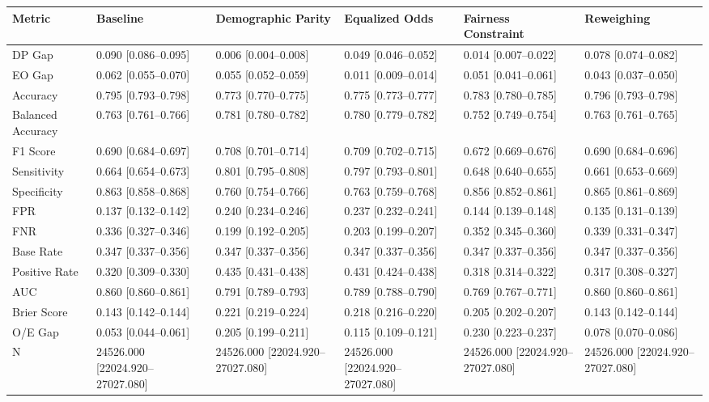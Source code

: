 \begin{tabular}{llllll}
\toprule
Metric & Baseline & Demographic Parity & Equalized Odds & Fairness Constraint & Reweighing \\
\midrule
DP Gap & 0.090 [0.086--0.095] & 0.006 [0.004--0.008] & 0.049 [0.046--0.052] & 0.014 [0.007--0.022] & 0.078 [0.074--0.082] \\
EO Gap & 0.062 [0.055--0.070] & 0.055 [0.052--0.059] & 0.011 [0.009--0.014] & 0.051 [0.041--0.061] & 0.043 [0.037--0.050] \\
Accuracy & 0.795 [0.793--0.798] & 0.773 [0.770--0.775] & 0.775 [0.773--0.777] & 0.783 [0.780--0.785] & 0.796 [0.793--0.798] \\
Balanced Accuracy & 0.763 [0.761--0.766] & 0.781 [0.780--0.782] & 0.780 [0.779--0.782] & 0.752 [0.749--0.754] & 0.763 [0.761--0.765] \\
F1 Score & 0.690 [0.684--0.697] & 0.708 [0.701--0.714] & 0.709 [0.702--0.715] & 0.672 [0.669--0.676] & 0.690 [0.684--0.696] \\
Sensitivity & 0.664 [0.654--0.673] & 0.801 [0.795--0.808] & 0.797 [0.793--0.801] & 0.648 [0.640--0.655] & 0.661 [0.653--0.669] \\
Specificity & 0.863 [0.858--0.868] & 0.760 [0.754--0.766] & 0.763 [0.759--0.768] & 0.856 [0.852--0.861] & 0.865 [0.861--0.869] \\
FPR & 0.137 [0.132--0.142] & 0.240 [0.234--0.246] & 0.237 [0.232--0.241] & 0.144 [0.139--0.148] & 0.135 [0.131--0.139] \\
FNR & 0.336 [0.327--0.346] & 0.199 [0.192--0.205] & 0.203 [0.199--0.207] & 0.352 [0.345--0.360] & 0.339 [0.331--0.347] \\
Base Rate & 0.347 [0.337--0.356] & 0.347 [0.337--0.356] & 0.347 [0.337--0.356] & 0.347 [0.337--0.356] & 0.347 [0.337--0.356] \\
Positive Rate & 0.320 [0.309--0.330] & 0.435 [0.431--0.438] & 0.431 [0.424--0.438] & 0.318 [0.314--0.322] & 0.317 [0.308--0.327] \\
AUC & 0.860 [0.860--0.861] & 0.791 [0.789--0.793] & 0.789 [0.788--0.790] & 0.769 [0.767--0.771] & 0.860 [0.860--0.861] \\
Brier Score & 0.143 [0.142--0.144] & 0.221 [0.219--0.224] & 0.218 [0.216--0.220] & 0.205 [0.202--0.207] & 0.143 [0.142--0.144] \\
O/E Gap & 0.053 [0.044--0.061] & 0.205 [0.199--0.211] & 0.115 [0.109--0.121] & 0.230 [0.223--0.237] & 0.078 [0.070--0.086] \\
N & 24526.000 [22024.920--27027.080] & 24526.000 [22024.920--27027.080] & 24526.000 [22024.920--27027.080] & 24526.000 [22024.920--27027.080] & 24526.000 [22024.920--27027.080] \\

\end{tabular}
